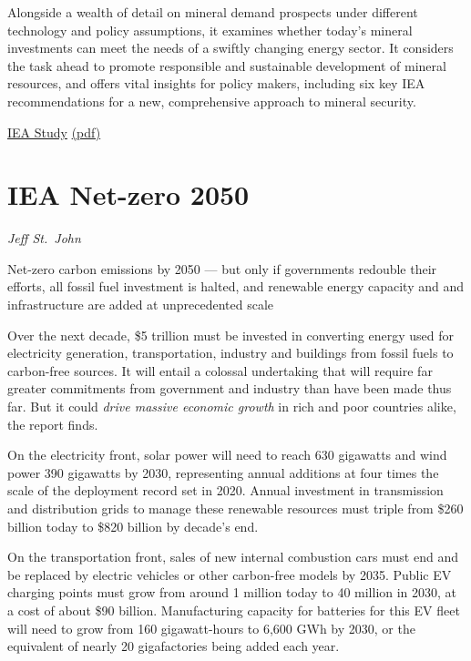 \documentclass[
]{book}
\begin{document}
Alongside a wealth of detail on mineral demand prospects under different technology and policy assumptions, it examines whether today's mineral investments can meet the needs of a swiftly changing energy sector. It considers the task ahead to promote responsible and sustainable development of mineral resources, and offers vital insights for policy makers, including six key IEA recommendations for a new, comprehensive approach to mineral security.

\href{https://www.iea.org/reports/the-role-of-critical-minerals-in-clean-energy-transitions}{IEA Study}
\href{pdf/IEA_2021_Minerals_Energy_Transitions.pdf}{(pdf)}

\hypertarget{iea-net-zero-2050}{%
\section{IEA Net-zero 2050}\label{iea-net-zero-2050}}

\emph{Jeff St.~John}

Net-zero carbon emissions by 2050 --- but only if governments redouble their efforts, all fossil fuel investment is halted, and renewable energy capacity and and infrastructure are added at unprecedented scale

Over the next decade, \$5 trillion must be invested in converting energy used for electricity generation, transportation, industry and buildings from fossil fuels to carbon-free sources. It will entail a colossal undertaking that will require far greater commitments from government and industry than have been made thus far. But it could \emph{drive massive economic growth} in rich and poor countries alike, the report finds.

On the electricity front, solar power will need to reach 630 gigawatts and wind power 390 gigawatts by 2030, representing annual additions at four times the scale of the deployment record set in 2020. Annual investment in transmission and distribution grids to manage these renewable resources must triple from \$260 billion today to \$820 billion by decade's end.

On the transportation front, sales of new internal combustion cars must end and be replaced by electric vehicles or other carbon-free models by 2035. Public EV charging points must grow from around 1 million today to 40 million in 2030, at a cost of about \$90 billion. Manufacturing capacity for batteries for this EV fleet will need to grow from 160 gigawatt-hours to 6,600 GWh by 2030, or the equivalent of nearly 20 gigafactories being added each year.
\end{document}
